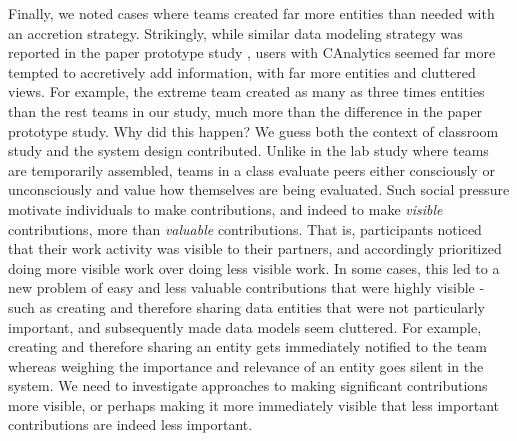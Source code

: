 Finally, we noted cases where teams created far more entities than needed with an
accretion strategy. Strikingly, while similar data modeling strategy was
reported in the paper prototype study \citep{Carroll2013}, users with CAnalytics
seemed far more tempted to accretively add information, with far more entities
and cluttered views. For example, the extreme team created as many as three
times entities than the rest teams in our study, much more than the difference
in the paper prototype study. Why did this happen? We guess both the context of
classroom study and the system design contributed. Unlike in the lab study where
teams are temporarily assembled, teams in a class evaluate peers either
consciously or unconsciously and value how themselves are being evaluated. Such
social pressure motivate individuals to make contributions, and indeed to make
\emph{visible} contributions, more than \emph{valuable} contributions. That is,
participants noticed that their work activity was visible to their partners, and
accordingly prioritized doing more visible work over doing less visible work. In
some cases, this led to a new problem of easy and less valuable contributions
that were highly visible - such as creating and therefore sharing data entities
that were not particularly important, and subsequently made data models seem
cluttered. For example, creating and therefore sharing an entity gets
immediately notified to the team whereas weighing the importance and relevance
of an entity goes silent in the system. We need to investigate approaches to
making significant contributions more visible, or perhaps making it more
immediately visible that less important contributions are indeed less important.